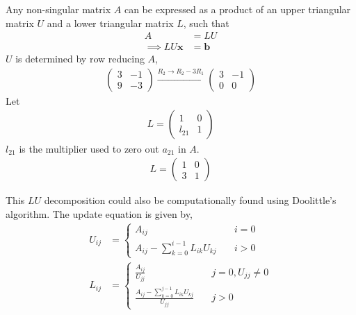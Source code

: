 \documentclass{beamer}
\theoremstyle{remark}
\newcommand{\myvec}[1]{\ensuremath{\begin{pmatrix}#1\end{pmatrix}}}
\let\vec\mathbf
\numberwithin{equation}{section}
\begin{document}
\begin{frame}
Any non-singular matrix $A$ can be expressed as a product of an upper triangular matrix $U$ and a lower triangular matrix $L$, such that
\begin{align}
    A &= LU\\
    \implies LU\vec{x} &= \vec{b}
\end{align}
$U$ is determined by row reducing $A$,
\begin{align}
    \myvec{3 & -1\\9 & -3} \xrightarrow{R_2 \to R_2 - 3R_1} \myvec{3 & -1\\0 & 0}
\end{align}
Let 
\begin{align}
    L = \myvec{1 & 0\\l_{21} & 1}
\end{align}
$l_{21}$ is the multiplier used to zero out $a_{21}$ in $A$.
\begin{align}
    L = \myvec{1 & 0\\3 & 1}
\end{align}
\end{frame}

\begin{frame}
This $LU$ decomposition could also be computationally found using Doolittle's algorithm. The update equation is given by,
\begin{align}
    U_{ij} &= \begin{cases}
        A_{ij} & \quad i = 0\\
        A_{ij} - \sum_{k = 0}^{i - 1} L_{ik} U_{kj} & \quad i > 0
    \end{cases}\\
    L_{ij} &= \begin{cases}
        \frac{A_{ij}}{U_{jj}} & \quad j = 0, U_{jj} \neq 0\\
        \frac{A_{ij} - \sum_{k = 0}^{j - 1} L_{ik} U_{kj}}{U_{jj}} & \quad j > 0
    \end{cases}\\
\end{align}
\end{frame}
\end{document}
